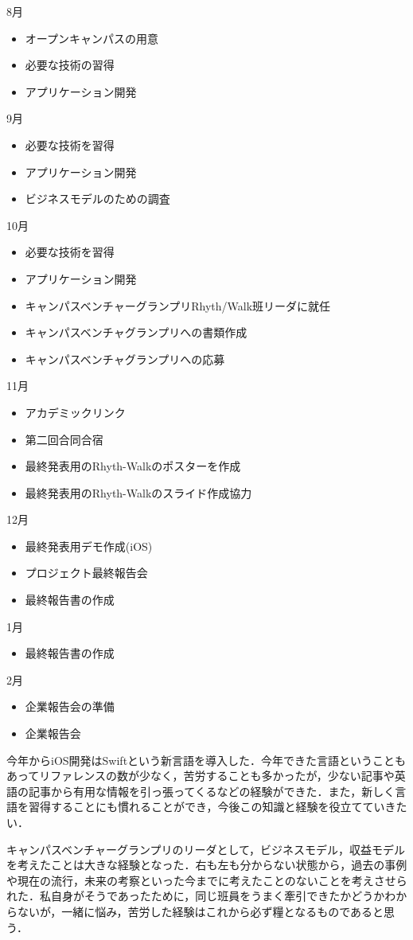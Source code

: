 8月
\begin{itemize}
\item オープンキャンパスの用意
\item 必要な技術の習得
\item アプリケーション開発
\end{itemize}
9月
\begin{itemize}
\item 必要な技術を習得
\item アプリケーション開発
\item ビジネスモデルのための調査
\end{itemize}
10月
\begin{itemize}
\item 必要な技術を習得
\item アプリケーション開発
\item キャンパスベンチャーグランプリRhyth/Walk班リーダに就任
\item キャンパスベンチャグランプリへの書類作成
\item キャンパスベンチャグランプリへの応募
\end{itemize}
11月
\begin{itemize}
\item アカデミックリンク
\item 第二回合同合宿
\item 最終発表用のRhyth-Walkのポスターを作成
\item 最終発表用のRhyth-Walkのスライド作成協力
\end{itemize}
12月
\begin{itemize}
\item 最終発表用デモ作成(iOS)
\item プロジェクト最終報告会
\item 最終報告書の作成
\end{itemize}
1月
\begin{itemize}
\item 最終報告書の作成
\end{itemize}
2月
\begin{itemize}
\item 企業報告会の準備
\item 企業報告会
\end{itemize}
\par
今年からiOS開発はSwiftという新言語を導入した．今年できた言語ということもあってリファレンスの数が少なく，苦労することも多かったが，少ない記事や英語の記事から有用な情報を引っ張ってくるなどの経験ができた．また，新しく言語を習得することにも慣れることができ，今後この知識と経験を役立てていきたい．
\par
キャンパスベンチャーグランプリのリーダとして，ビジネスモデル，収益モデルを考えたことは大きな経験となった．右も左も分からない状態から，過去の事例や現在の流行，未来の考察といった今までに考えたことのないことを考えさせられた．私自身がそうであったために，同じ班員をうまく牽引できたかどうかわからないが，一緒に悩み，苦労した経験はこれから必ず糧となるものであると思う．
